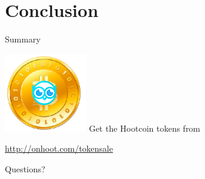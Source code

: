 \documentclass[10pt]{beamer}
\begin{document}
\section{Conclusion}

\begin{frame}{Summary}

\includegraphics[scale=0.5]{static/hootcoin} 
  Get the Hootcoin tokens from

  \begin{center}\url{http://onhoot.com/tokensale}\end{center}




  \begin{center}\ccbysa\end{center}

\end{frame}

\begin{frame}[standout]
  Questions?
\end{frame}
\end{document}
